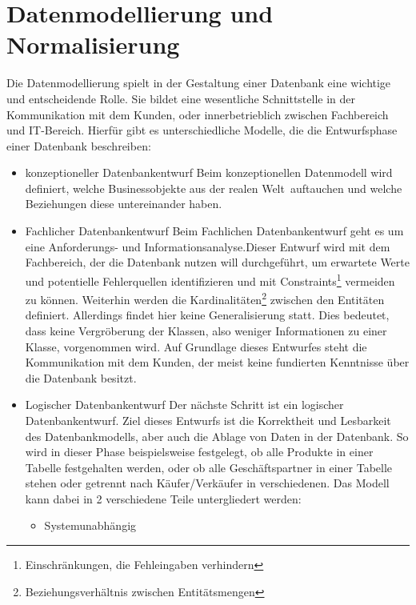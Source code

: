 \chapter{Datenmodellierung und Normalisierung}\label{ch:Data_Mod_Normal}
Die Datenmodellierung spielt in der Gestaltung einer Datenbank eine wichtige und entscheidende Rolle. Sie bildet eine wesentliche Schnittstelle in der Kommunikation mit dem Kunden, oder innerbetrieblich zwischen Fachbereich und IT-Bereich. Hierfür gibt es unterschiedliche Modelle, die die Entwurfsphase einer Datenbank beschreiben:
\begin{itemize}
	\item {konzeptioneller Datenbankentwurf}\newline
		Beim konzeptionellen Datenmodell wird definiert, welche Businessobjekte aus der \glqq realen Welt\grqq~auftauchen und welche Beziehungen diese untereinander haben. 
	\item {Fachlicher Datenbankentwurf}\newline
		Beim Fachlichen Datenbankentwurf geht es um eine Anforderungs- und Informationsanalyse.\cite{HS-Karslruhe:DB_Entwurf}Dieser Entwurf wird mit dem Fachbereich, der die Datenbank nutzen will durchgeführt, um erwartete Werte und potentielle Fehlerquellen identifizieren und mit Constraints\footnote{Einschränkungen, die Fehleingaben verhindern} vermeiden zu können. Weiterhin werden die Kardinalitäten\footnote{Beziehungsverhältnis zwischen Entitätsmengen\cite{Huckert:VL1_2}} zwischen den Entitäten definiert. Allerdings findet hier keine Generalisierung statt. Dies bedeutet, dass keine \glqq Vergröberung der Klassen\grqq, also weniger Informationen zu einer Klasse, vorgenommen wird.\cite{Möller:STS} Auf Grundlage dieses Entwurfes steht die Kommunikation mit dem Kunden, der meist keine fundierten Kenntnisse über die Datenbank besitzt.\cite{Möller:STS}
	\item {Logischer Datenbankentwurf}\newline
		Der nächste Schritt ist ein logischer Datenbankentwurf. Ziel dieses Entwurfs ist die Korrektheit und Lesbarkeit des Datenbankmodells, aber auch die Ablage von Daten in der Datenbank. So wird in dieser Phase beispielsweise festgelegt, ob alle Produkte in einer Tabelle festgehalten werden, oder ob alle Geschäftspartner in einer Tabelle stehen oder getrennt nach Käufer/Verkäufer in verschiedenen. Das Modell kann dabei in 2 verschiedene Teile untergliedert werden:
		\begin{itemize}
			\item {Systemunabhängig} \newline

\end{itemize}
\end{itemize}
